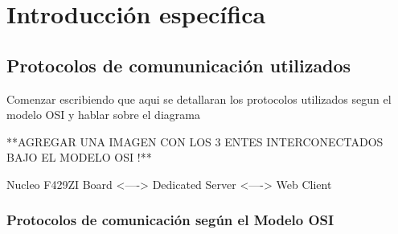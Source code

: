 \chapter{Introducción específica} %

\label{Chapter2}


\section{Protocolos de comununicación utilizados}

  Comenzar escribiendo que aqui se detallaran los protocolos utilizados segun el modelo OSI y hablar sobre el diagrama    

  **AGREGAR UNA IMAGEN CON LOS 3 ENTES INTERCONECTADOS BAJO EL MODELO OSI !**

        Nucleo F429ZI Board <----> Dedicated Server <----> Web Client


\subsection{Protocolos de comunicación según el Modelo OSI}

